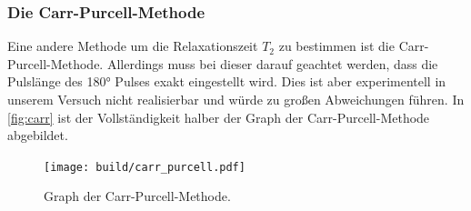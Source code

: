 \subsubsection{Die Carr-Purcell-Methode}
Eine andere Methode um die Relaxationszeit $T_2$ zu bestimmen ist die Carr-Purcell-Methode.
Allerdings muss bei dieser darauf geachtet werden, dass die Pulslänge des 180° Pulses exakt
eingestellt wird.
Dies ist aber experimentell in unserem Versuch nicht realisierbar und würde zu großen
Abweichungen führen.
In \autoref{fig:carr} ist der Vollständigkeit halber der Graph der Carr-Purcell-Methode abgebildet.
\begin{figure}
    \centering
    \texttt{[image: build/carr\_purcell.pdf]}
    \caption{Graph der Carr-Purcell-Methode.}
    \label{fig:carr}
\end{figure} 

